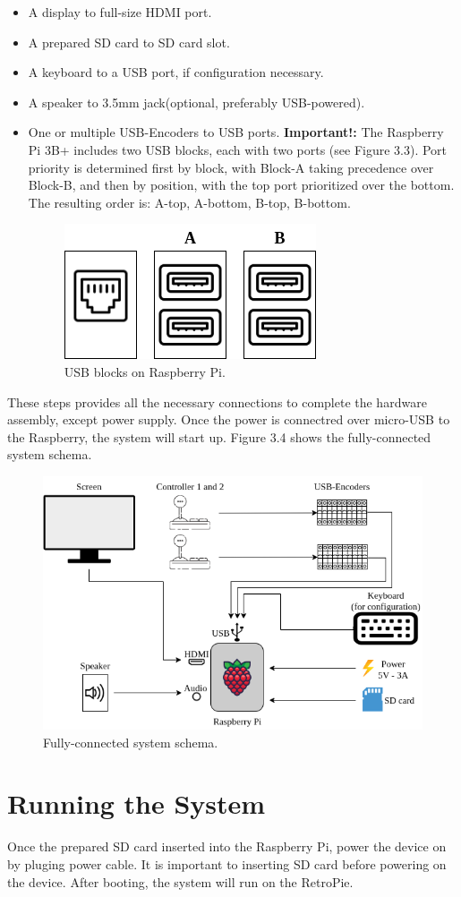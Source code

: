 \begin{itemize}
  \item A display to full-size HDMI port.
  \item A prepared SD card to SD card slot.
  \item A keyboard to a USB port, if configuration necessary.
  \item A speaker to 3.5mm jack(optional, preferably USB-powered).
  \item One or multiple USB-Encoders to USB ports.
    \newline\textbf{Important!:} The Raspberry Pi 3B+ includes two USB blocks, each with two ports (see Figure 3.3). Port priority is determined first by block, with Block-A taking precedence over Block-B, and then by position, with the top port prioritized over the bottom. The resulting order is: A-top, A-bottom, B-top, B-bottom.

    \newpage

    \begin{figure}[htb]
      \centering
      \includegraphics[scale=0.85]{F_Figures/usb_ports.png}
      \caption{USB blocks on Raspberry Pi.}
      \label{fig:usb_ports}
    \end{figure}

\end{itemize}

These steps provides all the necessary connections to complete the hardware assembly, except power supply. Once the power is connectred over micro-USB to the Raspberry, the system will start up.
Figure 3.4 shows the fully-connected system schema.
\\
\begin{figure}[htb]
  \centering
  \includegraphics[scale=0.58]{F_Figures/system_schema.png}
  \caption{Fully-connected system schema.}
  \label{fig:system_schmema}
\end{figure}

\section{Running the System}
\label{sec:running_system}
Once the prepared SD card inserted into the Raspberry Pi, power the device on by pluging power cable. It is important to inserting SD card before powering on the device. After booting, the system will run on the RetroPie.
